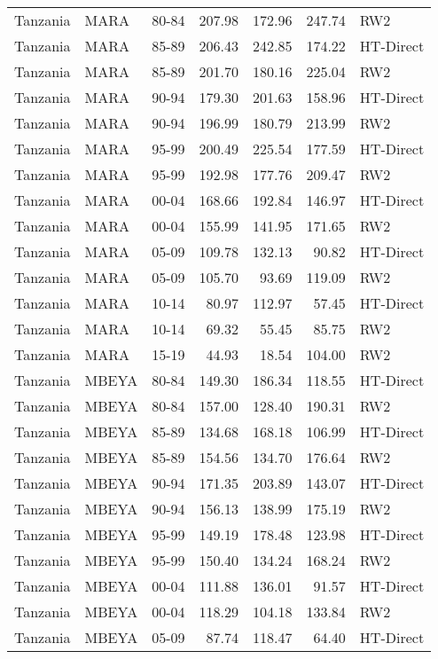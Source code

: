 \begin{longtable}{lllrrrl}
  Tanzania & MARA & 80-84 & 207.98 & 172.96 & 247.74 & RW2 \\ 
  Tanzania & MARA & 85-89 & 206.43 & 242.85 & 174.22 & HT-Direct \\ 
  Tanzania & MARA & 85-89 & 201.70 & 180.16 & 225.04 & RW2 \\ 
  Tanzania & MARA & 90-94 & 179.30 & 201.63 & 158.96 & HT-Direct \\ 
  Tanzania & MARA & 90-94 & 196.99 & 180.79 & 213.99 & RW2 \\ 
  Tanzania & MARA & 95-99 & 200.49 & 225.54 & 177.59 & HT-Direct \\ 
  Tanzania & MARA & 95-99 & 192.98 & 177.76 & 209.47 & RW2 \\ 
  Tanzania & MARA & 00-04 & 168.66 & 192.84 & 146.97 & HT-Direct \\ 
  Tanzania & MARA & 00-04 & 155.99 & 141.95 & 171.65 & RW2 \\ 
  Tanzania & MARA & 05-09 & 109.78 & 132.13 & 90.82 & HT-Direct \\ 
  Tanzania & MARA & 05-09 & 105.70 & 93.69 & 119.09 & RW2 \\ 
  Tanzania & MARA & 10-14 & 80.97 & 112.97 & 57.45 & HT-Direct \\ 
  Tanzania & MARA & 10-14 & 69.32 & 55.45 & 85.75 & RW2 \\ 
  Tanzania & MARA & 15-19 & 44.93 & 18.54 & 104.00 & RW2 \\ 
  Tanzania & MBEYA & 80-84 & 149.30 & 186.34 & 118.55 & HT-Direct \\ 
  Tanzania & MBEYA & 80-84 & 157.00 & 128.40 & 190.31 & RW2 \\ 
  Tanzania & MBEYA & 85-89 & 134.68 & 168.18 & 106.99 & HT-Direct \\ 
  Tanzania & MBEYA & 85-89 & 154.56 & 134.70 & 176.64 & RW2 \\ 
  Tanzania & MBEYA & 90-94 & 171.35 & 203.89 & 143.07 & HT-Direct \\ 
  Tanzania & MBEYA & 90-94 & 156.13 & 138.99 & 175.19 & RW2 \\ 
  Tanzania & MBEYA & 95-99 & 149.19 & 178.48 & 123.98 & HT-Direct \\ 
  Tanzania & MBEYA & 95-99 & 150.40 & 134.24 & 168.24 & RW2 \\ 
  Tanzania & MBEYA & 00-04 & 111.88 & 136.01 & 91.57 & HT-Direct \\ 
  Tanzania & MBEYA & 00-04 & 118.29 & 104.18 & 133.84 & RW2 \\ 
  Tanzania & MBEYA & 05-09 & 87.74 & 118.47 & 64.40 & HT-Direct \\ 

\end{longtable}
